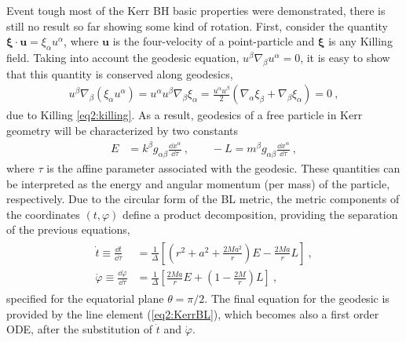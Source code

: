 Event tough most of the Kerr BH basic properties were demonstrated, there is still no result so far showing some kind of rotation.
First, consider the quantity $\bm{\xi}\cdot \bm{u} = \xi_\alpha u^\alpha$, where $\bm{u}$ is the four-velocity of a point-particle and $\bm{\xi}$ is any Killing field. 
Taking into account the geodesic equation, $u^\beta \nabla_\beta u^\alpha = 0$, it is easy to show that this quantity is conserved along geodesics,
\begin{align}
    u^\beta \nabla_\beta ( \xi_\alpha u^\alpha ) = u^\alpha u^\beta \nabla_\beta \xi_\alpha = \frac{u^\alpha u^\beta }{2} \left( \nabla_\alpha \xi_\beta + \nabla_\beta \xi_\alpha \right) = 0 ~,
    \label{eq2:geodesicKilling}
\end{align}
due to Killing \eqref{eq2:killing}.
As a result, geodesics of a free particle in Kerr geometry will be characterized by two constants
\begin{align}
    E &=  k^\beta g_{\alpha\beta} \frac{\dd x^\alpha}{\dd \tau} ~, \qquad -L = m^\beta g_{\alpha\beta} \frac{\dd x^\alpha}{\dd \tau} ~,
    \label{eq2:geodesicConsts}
\end{align}
where $\tau$ is the affine parameter associated with the geodesic.
These quantities can be interpreted as the energy and angular momentum (per mass) of the particle, respectively.
Due to the circular form of the BL metric, the metric components of the coordinates $(t,\varphi)$ define a product decomposition, providing the separation of the previous equations,
\begin{align}
    \label{eq2:geodesicTPhi}
    \begin{split}
        \dot{t} \equiv \frac{\dd t}{\dd \tau} &= \frac{1}{\Delta} \left[ (r^2+a^2 +\frac{2 M a^2}{r})E - \frac{2 M a}{r} L \right] ~,  \\
        \dot{\varphi} \equiv \frac{\dd \varphi}{\dd \tau} &= \frac{1}{\Delta} \left[ \frac{2 M a}{r} E +\left( 1- \frac{2 M}{r} \right) L \right]  ~,
    \end{split}
\end{align}
specified for the equatorial plane $\theta=\pi/2$.
The final equation for the geodesic is provided by the line element (\ref{eq2:KerrBL}), which becomes also a first order ODE, after the substitution of $\dot{t}$ and $\dot{\varphi}$. 

